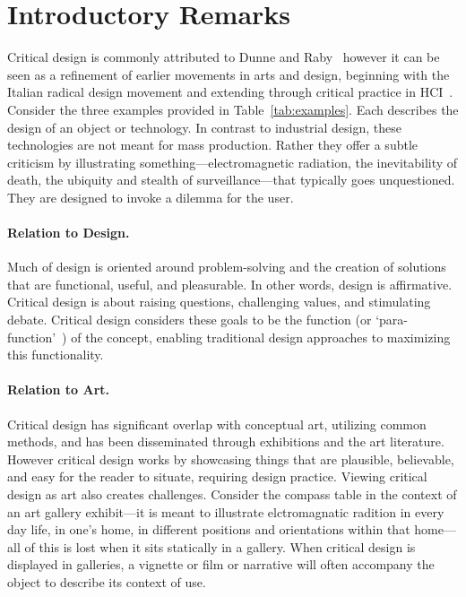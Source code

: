 
\section{Introductory Remarks}



Critical design is commonly attributed to Dunne and Raby~\cite{DuRa01,Dun05} however it can be seen as a refinement of earlier movements in arts and design, beginning with the Italian radical design movement and extending through critical practice in HCI~\cite{Mal17}. Consider the three examples provided in Table~\ref{tab:examples}. Each describes the design of an object or technology. In contrast to industrial design, these technologies are not meant for mass production. Rather they offer a subtle criticism by illustrating something---electromagnetic radiation, the inevitability of death, the ubiquity and stealth of surveillance---that typically goes unquestioned. They are designed to invoke a dilemma for the user.

\paragraph{Relation to Design.}

Much of design is oriented around problem-solving and the creation of solutions that are functional, useful, and pleasurable. In other words, design is affirmative. Critical design is about raising questions, challenging values, and stimulating debate. Critical design considers these goals to be the function (or `para-function'~\cite{Dun05}) of the concept, enabling traditional design approaches to maximizing this functionality. 


\paragraph{Relation to Art.} 

Critical design has significant overlap with conceptual art, utilizing common methods, and has been disseminated through exhibitions and the art literature. However critical design works by showcasing things that are plausible, believable, and easy for the reader to situate, requiring design practice. Viewing critical design as art also creates challenges. Consider the compass table in the context of an art gallery exhibit---it is meant to illustrate elctromagnatic radition in every day life, in one's home, in different positions and orientations within that home---all of this is lost when it sits statically in a gallery. When critical design is displayed in galleries, a vignette or film or narrative will often accompany the object to describe its context of use.

